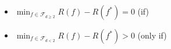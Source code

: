 \documentclass{article}
\begin{document}
\begin{itemize}
	\item $\min_{f \in \mathcal{F}_{d \geq 2}} R(f) - R(f^*) = 0$ \qquad (if)
	\item $\min_{f \in \mathcal{F}_{d<2}} R(f) - R(f^*) > 0$ \qquad (only
		if)
\end{itemize}
\end{document}
